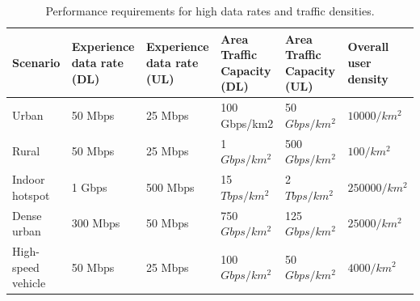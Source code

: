 \begin{table}[h!]
\centering
\begin{tabular}{|p{1.8 cm}| p{1.8 cm} |p{1.8 cm}| p{2 cm}| p{2 cm}| p{2 cm}|} 


 \hline
 \cellcolor[HTML]{23a5e2} \color[HTML]{ffffff} \textbf{Scenario} &\cellcolor[HTML]{23a5e2} \color[HTML]{ffffff} \textbf{Experience data rate (DL)}  & \cellcolor[HTML]{23a5e2} \color[HTML]{ffffff} \textbf{Experience data rate (UL)} &\cellcolor[HTML]{23a5e2}\color[HTML]{ffffff} \textbf{Area Traffic Capacity (DL)}   &\cellcolor[HTML]{23a5e2} \color[HTML]{ffffff} \textbf{Area Traffic Capacity (UL)}    & \cellcolor[HTML]{23a5e2}\cellcolor[HTML]{23a5e2} \color[HTML]{ffffff}\textbf{Overall user density }  \\ 
 \hline
 Urban & 50 Mbps &   25 Mbps &  100 \break   Gbps/km2 &     50 \break $Gbps/km^2$  &   $10000/km^2$   \\ 
  \hline
 Rural &     50  Mbps &  25   Mbps &   1 \break   $Gbps/km^2$  &  500 \break  $Gbps/km^2$  & $100/km^2$  \\
  \hline
 Indoor hotspot &    1 Gbps &    500 Mbps &  15  \break   $Tbps/km^2$  &    2 \break $Tbps/km^2$  &   $250000/km^2$  \\
  \hline
 Dense urban &   300 Mbps &  50 Mbps &   750 \break  $Gbps/km^2$  &  125 \break   $Gbps/km^2$  &  $25000/km^2$  \\
  \hline
High- speed vehicle &    50 Mbps &   25 Mbps &    100  \break  $Gbps/km^2$  &   50  \break $Gbps/km^2$  &   $4000/km^2$  \\ [1ex] 
 \hline
\end{tabular}
\caption{Performance requirements for high data rates and traffic densities\cite{5G_Ser_req_nex_gen2018study}.}
\label{table:Performance_requirements_highdatarates_traffic_densities}
\end{table}



